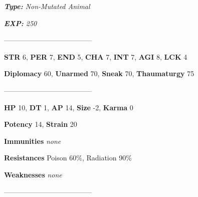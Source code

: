 \documentclass[11pt,a4paper,twocolumn]{book}
\begin{document}
	\noindent
	\emph{\textbf{Type:} Non-Mutated Animal}
	
	\noindent
	\emph{\textbf{EXP:} 250}
	
%		
%	
%		

	--------------------------------------

	\noindent
	\textbf{STR} 6, \textbf{PER} 7, \textbf{END} 5, \textbf{CHA} 7, \textbf{INT} 7, \textbf{AGI} 8, \textbf{LCK} 4
	
	\noindent
	\textbf{Diplomacy} 60, \textbf{Unarmed} 70, \textbf{Sneak} 70, \textbf{Thaumaturgy} 75
	
	--------------------------------------
	
	\noindent
	\textbf{HP} 10, \textbf{DT} 1, \textbf{AP} 14, \textbf{Size} -2, \textbf{Karma} 0
	
	\noindent
	\textbf{Potency} 14, \textbf{Strain} 20
	
	\noindent
	\textbf{Immunities} \emph{none} %
	
	\noindent
	\textbf{Resistances} Poison 60\%, Radiation 90\%%
	
	\noindent
	\textbf{Weaknesses} \emph{none}%
	
	--------------------------------------
	
\end{document}
